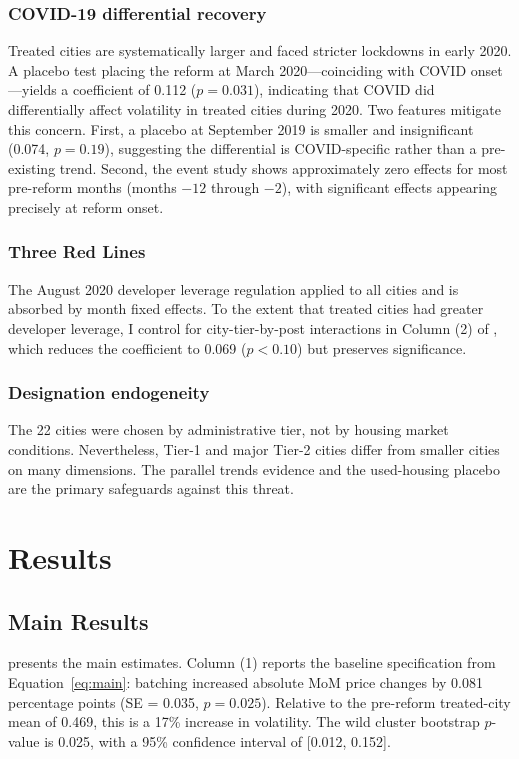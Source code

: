 \documentclass[12pt]{article}
\begin{document}
\subsubsection*{COVID-19 differential recovery} Treated cities are systematically larger and faced stricter lockdowns in early 2020. A placebo test placing the reform at March 2020---coinciding with COVID onset---yields a coefficient of 0.112 ($p = 0.031$), indicating that COVID did differentially affect volatility in treated cities during 2020. Two features mitigate this concern. First, a placebo at September 2019 is smaller and insignificant (0.074, $p = 0.19$), suggesting the differential is COVID-specific rather than a pre-existing trend. Second, the event study shows approximately zero effects for most pre-reform months (months $-12$ through $-2$), with significant effects appearing precisely at reform onset.

\subsubsection*{Three Red Lines} The August 2020 developer leverage regulation applied to all cities and is absorbed by month fixed effects. To the extent that treated cities had greater developer leverage, I control for city-tier-by-post interactions in Column (2) of , which reduces the coefficient to 0.069 ($p < 0.10$) but preserves significance.

\subsubsection*{Designation endogeneity} The 22 cities were chosen by administrative tier, not by housing market conditions. Nevertheless, Tier-1 and major Tier-2 cities differ from smaller cities on many dimensions. The parallel trends evidence and the used-housing placebo are the primary safeguards against this threat.

\section{Results}

\subsection{Main Results}

 presents the main estimates. Column (1) reports the baseline specification from Equation~\ref{eq:main}: batching increased absolute MoM price changes by 0.081 percentage points (SE = 0.035, $p = 0.025$). Relative to the pre-reform treated-city mean of 0.469, this is a 17\% increase in volatility. The wild cluster bootstrap $p$-value is 0.025, with a 95\% confidence interval of [0.012, 0.152].
\end{document}
